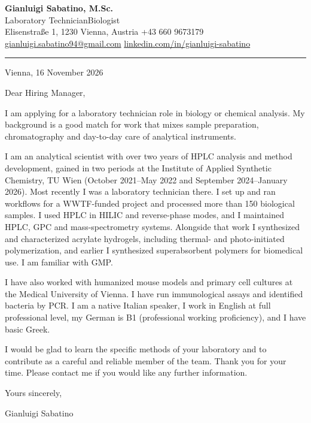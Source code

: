 \documentclass[10pt,a4paper]{article}
\begin{document}
\fontsize{10.5}{14.2}\selectfont

{\fontsize{18}{21}\selectfont\bfseries\color{navy} Gianluigi Sabatino, M.Sc.}\\[0.2em]
{\color{teal} Laboratory Technician\enspace\textbar\enspace Biologist}\\[0.45em]
{\small\color{muted}%
  \enspace Elisenstra{\ss}e 1, 1230 Vienna, Austria
  \quad
  \enspace +43 660 9673179\\[0.15em]
  \enspace \href{mailto:gianluigi.sabatino94@gmail.com}{gianluigi.sabatino94@gmail.com}
  \quad
  \enspace \href{https://www.linkedin.com/in/gianluigi-sabatino/}{linkedin.com/in/gianluigi-sabatino}%
}

\vspace{0.2em}
{\color{teal}\rule{\textwidth}{1.1pt}}

\hfill Vienna, 16 November 2026

Dear Hiring Manager,

I am applying for a laboratory technician role in biology or chemical analysis. My background is a good match for work that mixes sample preparation, chromatography and day-to-day care of analytical instruments.

I am an analytical scientist with over two years of HPLC analysis and method development, gained in two periods at the Institute of Applied Synthetic Chemistry, TU Wien (October 2021--May 2022 and September 2024--January 2026). Most recently I was a laboratory technician there. I set up and ran workflows for a WWTF-funded project and processed more than 150 biological samples. I used HPLC in HILIC and reverse-phase modes, and I maintained HPLC, GPC and mass-spectrometry systems. Alongside that work I synthesized and characterized acrylate hydrogels, including thermal- and photo-initiated polymerization, and earlier I synthesized superabsorbent polymers for biomedical use. I am familiar with GMP.

I have also worked with humanized mouse models and primary cell cultures at the Medical University of Vienna. I have run immunological assays and identified bacteria by PCR. I am a native Italian speaker, I work in English at full professional level, my German is B1 (professional working proficiency), and I have basic Greek.

I would be glad to learn the specific methods of your laboratory and to contribute as a careful and reliable member of the team. Thank you for your time. Please contact me if you would like any further information.

Yours sincerely,

\vspace{1.6em}
Gianluigi Sabatino
\end{document}
